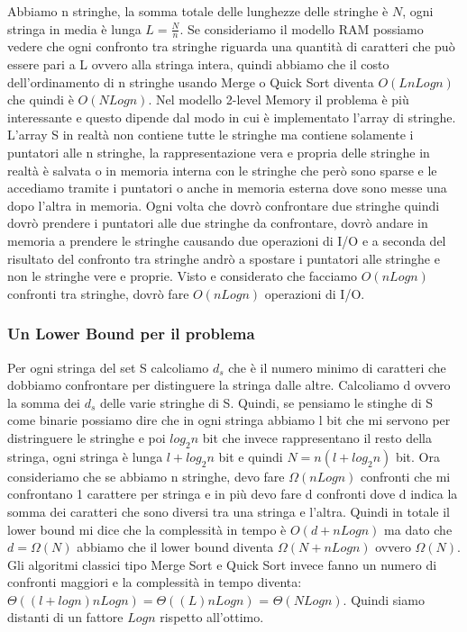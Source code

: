 \documentclass[14pt]{extreport}
\begin{document}
Abbiamo n stringhe, la somma totale delle lunghezze delle stringhe è $N$, ogni stringa in media è lunga $L=\frac{N}{n}$.
Se consideriamo il modello RAM possiamo vedere che ogni confronto tra stringhe riguarda una quantità di caratteri che può essere pari a L ovvero alla stringa intera, quindi abbiamo che il costo dell'ordinamento di n stringhe usando Merge o Quick Sort diventa $O(LnLogn)$ che quindi è $O(NLogn)$.
Nel modello 2-level Memory il problema è più interessante e questo dipende dal modo in cui è implementato l'array di stringhe.
L'array S in realtà non contiene tutte le stringhe ma contiene solamente i puntatori alle n stringhe, la rappresentazione vera e propria delle stringhe in realtà è salvata o in memoria interna con le stringhe che però sono sparse e le accediamo tramite i puntatori o anche in memoria esterna dove sono messe una dopo l'altra in memoria. 
Ogni volta che dovrò confrontare due stringhe quindi dovrò prendere i puntatori alle due stringhe da confrontare, dovrò andare in memoria a prendere le stringhe causando due operazioni di I/O e a seconda del risultato del confronto tra stringhe andrò a spostare i puntatori alle stringhe e non le stringhe vere e proprie.
Visto e considerato che facciamo $O(nLogn)$ confronti tra stringhe, dovrò fare $O(nLogn)$ operazioni di I/O.

\subsubsection{Un Lower Bound per il problema}

Per ogni stringa del set S calcoliamo $d_s$ che è il numero minimo di caratteri che dobbiamo confrontare per distinguere la stringa dalle altre. Calcoliamo d ovvero la somma dei $d_s$ delle varie stringhe di S. 
Quindi, se pensiamo le stinghe di S come binarie possiamo dire che in ogni stringa abbiamo l bit che mi servono per distringuere le stringhe e poi $log_2 n$ bit che invece rappresentano il resto della stringa, ogni stringa è lunga $l+log_2 n$ bit e quindi $N=n(l+log_2 n)$ bit.
Ora consideriamo che se abbiamo n stringhe, devo fare $\Omega(nLogn)$ confronti che mi confrontano 1 carattere per stringa e in più devo fare d confronti dove d indica la somma dei caratteri che sono diversi tra una stringa e l'altra. Quindi in totale il lower bound mi dice che la complessità in tempo è $O(d+nLogn)$ ma dato che $d=\Omega(N)$ abbiamo che il lower bound diventa $\Omega(N+nLogn)$ ovvero $\Omega(N)$.
Gli algoritmi classici tipo Merge Sort e Quick Sort invece fanno un numero di confronti maggiori e la complessità in tempo diventa: $\Theta((l+logn)nLogn) = \Theta((L)nLogn) $ = $\Theta(NLogn)$.
Quindi siamo distanti di un fattore $Logn$ rispetto all'ottimo.
\end{document}
